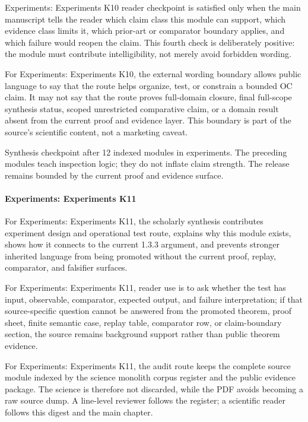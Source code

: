 Experiments: Experiments K10 reader checkpoint is satisfied only when the main manuscript tells the reader which claim class this module can support, which evidence class limits it, which prior-art or comparator boundary applies, and which failure would reopen the claim. This fourth check is deliberately positive: the module must contribute intelligibility, not merely avoid forbidden wording.


For Experiments: Experiments K10, the external wording boundary allows public language to say that the route helps organize, test, or constrain a bounded OC claim. It may not say that the route proves full-domain closure, final full-scope synthesis status, scoped unrestricted comparative claim, or a domain result absent from the current proof and evidence layer. This boundary is part of the source's scientific content, not a marketing caveat.


Synthesis checkpoint after 12 indexed modules in experiments. The preceding modules teach inspection logic; they do not inflate claim strength. The release remains bounded by the current proof and evidence surface.


\paragraph{Experiments: Experiments K11}

For Experiments: Experiments K11, the scholarly synthesis contributes experiment design and operational test route, explains why this module exists, shows how it connects to the current 1.3.3 argument, and prevents stronger inherited language from being promoted without the current proof, replay, comparator, and falsifier surfaces.


For Experiments: Experiments K11, reader use is to ask whether the test has input, observable, comparator, expected output, and failure interpretation; if that source-specific question cannot be answered from the promoted theorem, proof sheet, finite semantic case, replay table, comparator row, or claim-boundary section, the source remains background support rather than public theorem evidence.


For Experiments: Experiments K11, the audit route keeps the complete source module indexed by the science monolith corpus register and the public evidence package. The science is therefore not discarded, while the PDF avoids becoming a raw source dump. A line-level reviewer follows the register; a scientific reader follows this digest and the main chapter.


